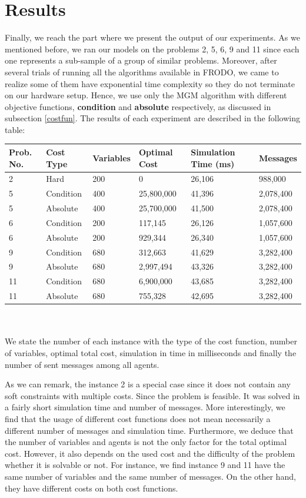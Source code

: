 \documentclass{article}
\begin{document}
	\section{Results}
	Finally, we reach the part where we present the output of our experiments. As we mentioned before, we ran our models on the problems 2, 5, 6, 9 and 11 since each one represents a sub-sample of a group of similar problems. Moreover, after several trials of running all the algorithms available in FRODO, we came to realize some of them have exponential time complexity so they do not terminate on our hardware setup. Hence, we use only the MGM algorithm with different objective functions, \textbf{condition} and \textbf{absolute} respectively, as discussed in subsection \ref{costfun}. The results of each experiment are described in the following table:\\
	
	\begin{tabular}{ |p{0.75cm}||p{1.5cm}|p{1.3cm}|p{1.75cm}|p{1.6cm}|p{1.5cm}| }
		\hline
		Prob. No.& Cost Type & Variables& Optimal Cost & Simulation Time (ms)& Messages\\
		\hline
		\hline
		2 & Hard & 200 & 0 & 26,106 & 988,000\\
		5 & Condition & 400 & 25,800,000 & 41,396 & 2,078,400\\
		5 & Absolute & 400 &  25,700,000 & 41,500 & 2,078,400\\
		6 & Condition & 200 & 117,145 & 26,126 & 1,057,600\\
		6 & Absolute & 200 & 929,344 & 26,340 & 1,057,600\\
		9 & Condition & 680 & 312,663 & 41,629 & 3,282,400\\
		9 & Absolute & 680 & 2,997,494 & 43,326 & 3,282,400\\
		11 & Condition & 680 & 6,900,000 & 43,685 & 3,282,400\\
		11 & Absolute & 680 & 755,328 & 42,695 & 3,282,400\\
		\hline
	\end{tabular}\\
	\\
	We state the number of each instance with the type of the cost function, number of variables, optimal total cost, simulation in time in milliseconds and finally the number of sent messages among all agents.
	
	As we can remark, the instance 2 is a special case since it does not contain any soft constraints with multiple costs. Since the problem is feasible. It was solved in a fairly short simulation time and number of messages. More interestingly, we find that the usage of different cost functions does not mean necessarily a different number of messages and simulation time. Furthermore, we deduce that the number of variables and agents is not the only factor for the total optimal cost. However, it also depends on the used cost and the difficulty of the problem whether it is solvable or not. For instance, we find instance 9 and 11 have the same number of variables and the same number of messages. On the other hand, they have different costs on both cost functions. 
	
\end{document}
